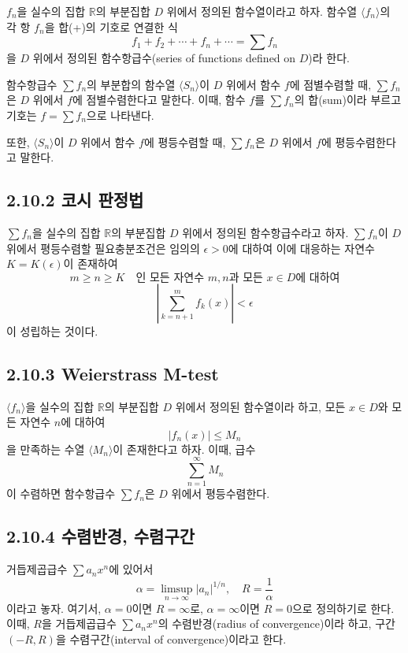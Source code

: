 \documentclass{article}
\begin{document}
$f_n$을 실수의 집합 $\mathbb{R}$의 부분집합 $D$ 위에서 정의된 함수열이라고 하자. 함수열 $\langle f_n \rangle$의 각 항 $f_n$을 합(+)의 기호로 연결한 식 
\[
f_1 + f_2 + \cdots + f_n + \cdots = \sum f_n
\]
을 $D$ 위에서 정의된 함수항급수(series of functions defined on $D$)라 한다. 

함수항급수 $\sum f_n$의 부분합의 함수열 $\langle S_n \rangle$이 $D$ 위에서 함수 $f$에 점별수렴할 때, $\sum f_n$은 $D$ 위에서 $f$에 점별수렴한다고 말한다. 이때, 함수 $f$를 $\sum f_n$의 합(sum)이라 부르고 기호는 $f = \sum f_n$으로 나타낸다. 

또한, $\langle S_n \rangle$이 $D$ 위에서 함수 $f$에 평등수렴할 때, $\sum f_n$은 $D$ 위에서 $f$에 평등수렴한다고 말한다.

\subsection*{\textmd{2.10.2 코시 판정법}}

$\sum f_n$을 실수의 집합 $\mathbb{R}$의 부분집합 $D$ 위에서 정의된 함수항급수라고 하자. $\sum f_n$이 $D$ 위에서 평등수렴할 필요충분조건은 
임의의 $\epsilon > 0$에 대하여 이에 대응하는 자연수 $K = K(\epsilon)$이 존재하여
\[
m \geq n \geq K \quad \text{인 모든 자연수 } m, n \text{과 모든 } x \in D \text{에 대하여}
\]
\[
\left| \sum_{k=n+1}^{m} f_k(x) \right| < \epsilon
\]
이 성립하는 것이다.

\subsection*{\textmd{2.10.3 Weierstrass M-test}}

$\langle f_n \rangle$을 실수의 집합 $\mathbb{R}$의 부분집합 $D$ 위에서 정의된 함수열이라 하고, 모든 $x \in D$와 모든 자연수 $n$에 대하여 
\[
|f_n(x)| \leq M_n
\]
을 만족하는 수열 $\langle M_n \rangle$이 존재한다고 하자. 이때, 급수 
\[
\sum_{n=1}^{\infty} M_n
\]
이 수렴하면 함수항급수 $\sum f_n$은 $D$ 위에서 평등수렴한다.

\subsection*{\textmd{2.10.4 수렴반경, 수렴구간}}

거듭제곱급수 $\sum a_n x^n$에 있어서 
\[
\alpha = \limsup_{n \to \infty} |a_n|^{1/n}, \quad R = \frac{1}{\alpha}
\]
이라고 놓자. 여기서, $\alpha = 0$이면 $R = \infty$로, $\alpha = \infty$이면 $R = 0$으로 정의하기로 한다. 이때, $R$을 거듭제곱급수 $\sum a_n x^n$의 수렴반경(radius of convergence)이라 하고, 구간 $(-R, R)$을 수렴구간(interval of convergence)이라고 한다.
\end{document}

